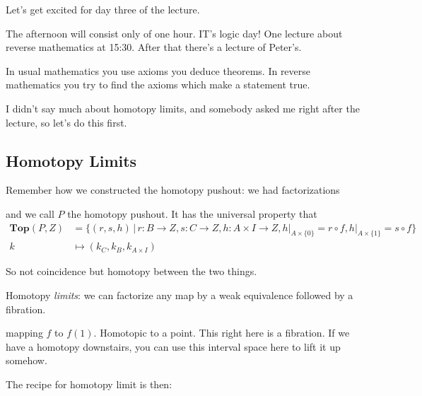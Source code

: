 \documentclass[../MH_Total.tex]{subfiles}
\begin{document}
Let's get excited for day three of the lecture.

The afternoon will consist only of one hour. IT's logic day! One lecture about reverse mathematics at 15:30. After that there's a lecture of Peter's. 

In usual mathematics you use axioms you deduce theorems. In reverse mathematics you try to find the axioms which make a statement true.

I didn't say much about homotopy limits, and somebody asked me right after the lecture, so let's do this first.

\subsection{Homotopy Limits}
Remember how we constructed the homotopy pushout: we had factorizations
\begin{center}
\end{center}
and we call $P$ the homotopy pushout. It has the universal property that
\begin{align*}
\mathbf{Top}(P,Z) &= \{(r,s,h) \,|\, r: B \to Z, s: C \to Z, h: A \times I \to Z, h|_{A \times \{0\}} = r \circ f, h|_{A \times \{1\}} = s \circ f\}\\
	k &\mapsto (k_C,k_B,k_{A \times I})
\end{align*}

So not coincidence but homotopy between the two things. 

Homotopy \emph{limits}: we can factorize any map by a weak equivalence followed by a fibration. 

\begin{center}
\end{center}
mapping $f$ to $f(1)$. Homotopic to a point. This right here is a fibration. If we have a homotopy downstairs, you can use this interval space here to lift it up somehow.

The recipe for homotopy limit is then:
\end{document}
